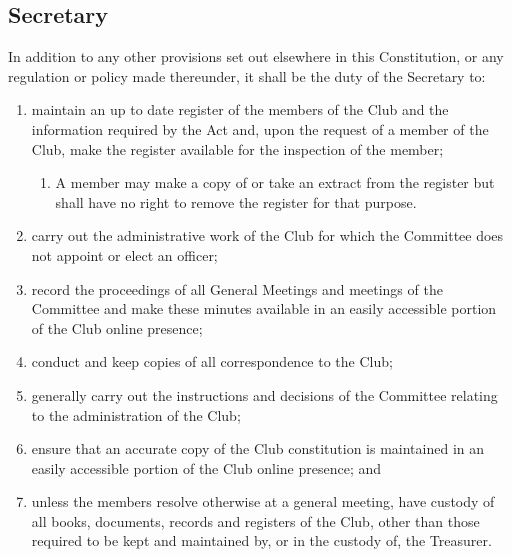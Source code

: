 \documentclass[11pt]{article} %
\begin{document}
\subsection{Secretary}
In addition to any other provisions set out elsewhere in this Constitution, or any regulation or policy made thereunder, it shall be the duty of the Secretary to:
\begin{enumerate}
	\item maintain an up to date register of the members of the Club and the information required by the Act and, upon the request of a member of the Club, make the register available for the inspection of the member;
	\begin{enumerate}[1.]
			\item A member may make a copy of or take an extract from the register but shall have no right to remove the register for that purpose.
		\end{enumerate}
	\item carry out the administrative work of the Club for which the Committee does not appoint or elect an officer;
	\item record the proceedings of all General Meetings and meetings of the Committee and make these minutes available in an easily accessible portion of the Club online presence;
	\item conduct and keep copies of all correspondence to the Club;
	\item generally carry out the instructions and decisions of the Committee relating to the administration of the Club;
	\item ensure that an accurate copy of the Club constitution is maintained in an easily accessible portion of the Club online presence; and
	\item unless the members resolve otherwise at a general meeting, have custody of all books, documents, records and registers of the Club, other than those required to be kept and maintained by, or in the custody of, the Treasurer.
\end{enumerate}
\end{document}
